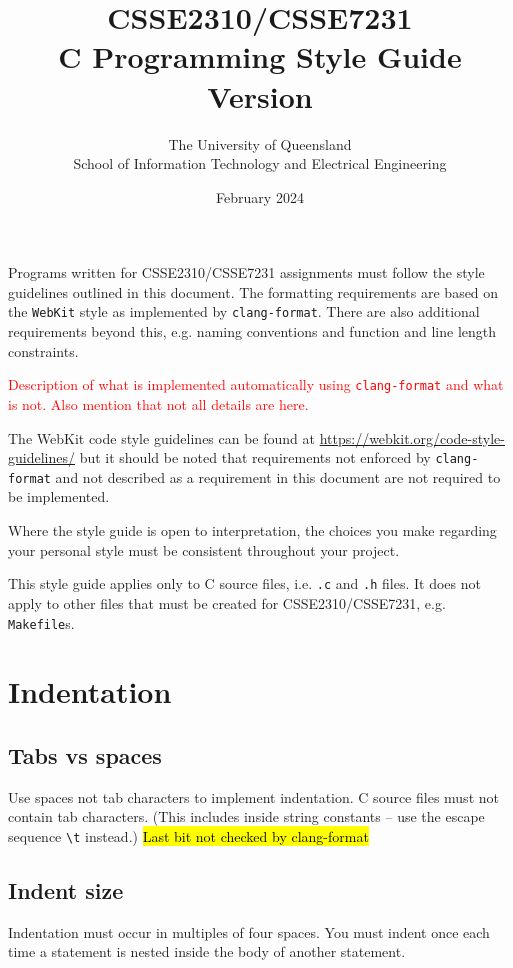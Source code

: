 \documentclass{article}
\title{CSSE2310/CSSE7231\\C Programming Style Guide\\Version \versionNum}
\author{The University of Queensland\\School of Information Technology and Electrical Engineering}
\date{February 2024}
\begin{document}
\maketitle
\thispagestyle{plain}
\linenumbers

\lstset{numbers=left, numberstyle=\ttfamily}

Programs written for CSSE2310/CSSE7231 assignments must follow the style guidelines outlined in this document. The formatting requirements are based on the \texttt{WebKit} style as implemented by \texttt{clang-format}. There are also
additional requirements beyond this, e.g. naming conventions and function and line length constraints. 

\textcolor{red}{Description of what is implemented automatically using \texttt{clang-format} and what is not. Also mention that not all details are here.}

The WebKit code style guidelines can be found at \url{https://webkit.org/code-style-guidelines/} but it should be
noted that requirements not enforced by \texttt{clang-format} and not described as a requirement in this document
are not required to be implemented.

Where the style guide is open to interpretation, the choices you make regarding your personal style 
must be consistent throughout your project.

This style guide applies only to C source files, i.e. \texttt{.c} and \texttt{.h} files. It does not apply to other files
that must be created for CSSE2310/CSSE7231, e.g. \texttt{Makefile}s. 

\section{Indentation}
\subsection{Tabs vs spaces}
Use spaces not tab characters to implement indentation. C source files must not contain tab characters. (This includes
inside string constants -- use the escape sequence \texttt{\textbackslash t} instead.) \hl{Last bit not checked by clang-format}

\subsection{Indent size}
Indentation must occur in multiples of four spaces. You must indent once each time a statement is nested inside the
body of another statement.
\end{document}
